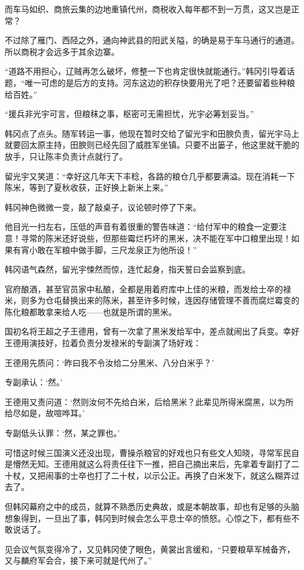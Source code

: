 而车马如织、商旅云集的边地重镇代州，商税收入每年都不到一万贯，这又岂是正常？

不过除了雁门、西陉之外，通向神武县的阳武关隘，的确是易于车马通行的通道。所以商税才会远多于其余边寨。

“道路不用担心，辽贼再怎么破坏，修整一下也肯定很快就能通行。”韩冈引导着话题，“唯一可虑的是后方的支持。河东这边的积存快要用光了吧？还要留着些种粮给百姓。”

“援兵非光宇可言，但粮秣之事，枢密可无需担忧，光宇必筹划妥当。”

韩冈点了点头。随军转运一事，他现在暂时交给了留光宇和田腴负责，留光宇马上就要回太原主持，田腴则已经先回了威胜军坐镇。只要不出篓子，他这里就干脆的放手，只让陈丰负责计点就行了。

留光宇又笑道：“幸好这几年天下丰稔，各路的粮仓几乎都要满溢。现在消耗一下陈米，等到了夏秋收获，正好换上新米上来。”

韩冈神色微微一变，敲了敲桌子，议论顿时停了下来。

他目光一扫左右，压低的声音有着很重的警告味道：“给付军中的粮食一定要注意！寻常的陈米还好说些，但那些霉烂朽坏的黑米，决不能在军中口粮里出现！如果有宵小敢在军粮中做手脚，三尺龙泉正为他所设！”

韩冈语气森然，留光宇悚然而惊，连忙起身，指天誓曰会监察到底。

官府酿酒，甚至官员家中私酿，全都是用着府库中上佳的米粮，而发给士卒的禄米，则多为仓屯替换出来的陈米，甚至许多时候，连因存储管理不善而腐烂霉变的陈化粮都敢拿来给人吃——也就是所谓的黑米。

国初名将王超之子王德用，曾有一次拿了黑米发给军中，差点就闹出了兵变。幸好王德用演技好，拉着负责分发禄米的专副演了场好戏：

王德用先质问：‘昨曰我不令汝给二分黑米、八分白米乎？’

专副承认：‘然。’

王德用又责问道：‘然则汝何不先给白米，后给黑米？此辈见所得米腐黑，以为所给尽如是，故喧哗耳。’

专副低头认罪：‘然，某之罪也。’

可惜这时候三国演义还没出现，曹操杀粮官的好戏也只有些文人知晓，寻常军民自是懵然无知。王德用就这么将责任往下一推，把自己摘出来后，先拿着专副打了二十杖，又把闹事的士卒也打了二十杖，以示公正。再换了白米发下，就这么糊弄过去了。

但韩冈幕府之中的成员，就算不熟悉历史典故，或是本朝故事，却也有足够的头脑想象得到，一旦出了事，韩冈到时候会怎么平息士卒的愤怒。心惊之下，都有些不敢说话了。

见会议气氛变得冷了，又见韩冈使了眼色，黄裳出言缓和，“只要粮草军械备齐，又与麟府军会合，接下来可就是代州了。”

